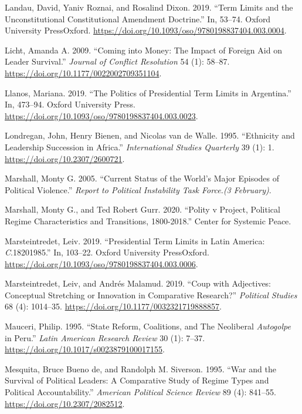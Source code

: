 \documentclass[
  12pt,
]{report}
\newlength{\cslhangindent}
\newenvironment{CSLReferences}[2] %
 {\begin{list}{}{%
  \setlength{\itemindent}{0pt}
  \setlength{\leftmargin}{0pt}
  \setlength{\parsep}{0pt}
  \ifodd #1
   \setlength{\leftmargin}{\cslhangindent}
   \setlength{\itemindent}{-1\cslhangindent}
  \fi
  \setlength{\itemsep}{#2\baselineskip}}}
 {\end{list}}
\begin{document}
\begin{CSLReferences}{1}{0}
Landau, David, Yaniv Roznai, and Rosalind Dixon. 2019. {``Term Limits
and the Unconstitutional Constitutional Amendment Doctrine.''} In,
53--74. Oxford University PressOxford.
\url{https://doi.org/10.1093/oso/9780198837404.003.0004}.

Licht, Amanda A. 2009. {``Coming into Money: The Impact of Foreign Aid
on Leader Survival.''} \emph{Journal of Conflict Resolution} 54 (1):
58--87. \url{https://doi.org/10.1177/0022002709351104}.

Llanos, Mariana. 2019. {``The Politics of Presidential Term Limits in
Argentina.''} In, 473--94. Oxford University Press.
\url{https://doi.org/10.1093/oso/9780198837404.003.0023}.

Londregan, John, Henry Bienen, and Nicolas van de Walle. 1995.
{``Ethnicity and Leadership Succession in Africa.''} \emph{International
Studies Quarterly} 39 (1): 1. \url{https://doi.org/10.2307/2600721}.

Marshall, Monty G. 2005. {``Current Status of the World's Major Episodes
of Political Violence.''} \emph{Report to Political Instability Task
Force.(3 February)}.

Marshall, Monty G., and Ted Robert Gurr. 2020. {``Polity v Project,
Political Regime Characteristics and Transitions, 1800-2018.''} Center
for Systemic Peace.

Marsteintredet, Leiv. 2019. {``Presidential Term Limits in Latin
America: {\emph{C}}.1820{\textendash}1985.''} In, 103--22. Oxford
University PressOxford.
\url{https://doi.org/10.1093/oso/9780198837404.003.0006}.

Marsteintredet, Leiv, and Andrés Malamud. 2019. {``Coup with Adjectives:
Conceptual Stretching or Innovation in Comparative Research?''}
\emph{Political Studies} 68 (4): 1014--35.
\url{https://doi.org/10.1177/0032321719888857}.

Mauceri, Philip. 1995. {``State Reform, Coalitions, and The Neoliberal
{\emph{Autogolpe}} in Peru.''} \emph{Latin American Research Review} 30
(1): 7--37. \url{https://doi.org/10.1017/s0023879100017155}.

Mesquita, Bruce Bueno de, and Randolph M. Siverson. 1995. {``War and the
Survival of Political Leaders: A Comparative Study of Regime Types and
Political Accountability.''} \emph{American Political Science Review} 89
(4): 841--55. \url{https://doi.org/10.2307/2082512}.


\end{CSLReferences}
\end{document}
